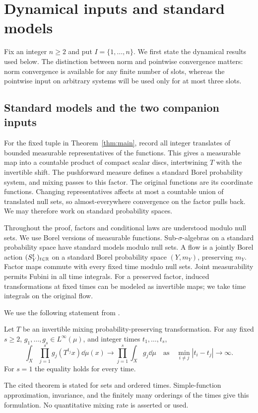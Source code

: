 \section{Dynamical inputs and standard models}
\label{sec:inputs}

Fix an integer $n\ge2$ and put $I=\{1,\ldots,n\}$. We first state
the dynamical results used below. The distinction between norm and
pointwise convergence matters: norm convergence is available for any
finite number of slots, whereas the pointwise input on arbitrary
systems will be used only for at most three slots.

\subsection{Standard models and the two companion inputs}

For the fixed tuple in Theorem~\ref{thm:main}, record all integer
translates of bounded measurable representatives of the functions.
This gives a measurable map into a countable product of compact scalar
discs, intertwining $T$ with the invertible shift. The pushforward
measure defines a standard Borel probability system, and mixing passes
to this factor. The original functions are its coordinate functions.
Changing representatives affects at most a countable union of translated
null sets, so almost-everywhere convergence on the factor pulls back.
We may therefore work on standard probability spaces.

Throughout the proof, factors and conditional laws are understood
modulo null sets. We use Borel versions of measurable functions.
Sub-$\sigma$-algebras on a standard probability space have standard
models modulo null sets. A flow is a jointly Borel action
$(S_Y^t)_{t\in\mathbb R}$ on a standard Borel probability space $(Y,m_Y)$,
preserving $m_Y$. Factor maps commute with every fixed time modulo
null sets. Joint measurability permits Fubini in all time integrals.
For a preserved factor, induced transformations at fixed times can be
modeled as invertible maps; we take time integrals on the original flow.

We use the following statement from
\cite[Theorem~1.1]{MixingCompanion}.
\begin{theorem}
\label{thm:multiple-mixing}
Let $T$ be an invertible mixing probability-preserving transformation.
For any fixed $s\ge2$, $g_1,\ldots,g_s\in L^\infty(\mu)$,
and integer times $t_1,\ldots,t_s$,
\[
 \int_X\prod_{j=1}^s g_j(T^{t_j}x)\dd\mu(x)
 \longrightarrow\prod_{j=1}^s\int_Xg_j\dd\mu
 \quad\text{as}\quad
 \min_{i\ne j}|t_i-t_j|\longrightarrow\infty.
\]
For $s=1$ the equality holds for every time.
\end{theorem}
The cited theorem is stated for sets and ordered times. Simple-function
approximation, invariance, and the finitely many orderings of the times
give this formulation. No quantitative mixing rate is asserted or used.

